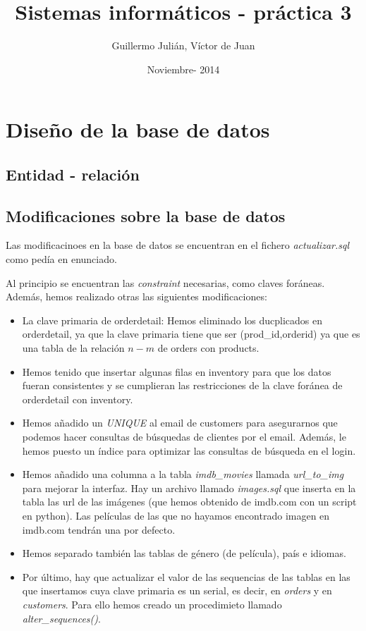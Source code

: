 \documentclass[nochap]{apuntes}
\title{Sistemas informáticos - práctica 3}
\author{Guillermo Julián, Víctor de Juan}
\date{Noviembre- 2014}
\begin{document}
\pagestyle{plain}
\maketitle

\tableofcontents
\newpage

\section{Diseño de la base de datos}
\subsection{Entidad - relación}

\subsection{Modificaciones sobre la base de datos}

Las modificacinoes en la base de datos se encuentran en el fichero \textit{actualizar.sql} como pedía en enunciado.


Al principio se encuentran las \textit{constraint} necesarias, como claves foráneas. Además, hemos realizado otras las siguientes modificaciones:

\begin{itemize}

\item La clave primaria de orderdetail: Hemos eliminado los ducplicados en orderdetail, ya que la clave primaria  tiene que ser (prod\_id,orderid) ya que es una tabla de la relación $n-m$ de orders con products. 

\item Hemos tenido que insertar algunas filas en inventory para que los datos fueran consistentes y se cumplieran las restricciones de la clave foránea de orderdetail con inventory.

\item Hemos añadido un \textit{UNIQUE} al email de customers para asegurarnos que podemos hacer consultas de búsquedas de clientes por el email. Además, le hemos puesto un índice para optimizar las consultas de búsqueda en el login.

\item Hemos añadido una columna a la tabla \textit{imdb\_movies} llamada \textit{url\_to\_img} para mejorar la interfaz. Hay un archivo llamado \textit{images.sql} que inserta en la tabla las url de las imágenes (que hemos obtenido de imdb.com con un script en python). Las películas de las que no hayamos encontrado imagen en imdb.com tendrán una por defecto.

\item Hemos separado también las tablas de género (de película), país e idiomas. 

\item Por último, hay que actualizar el valor de las sequencias de las tablas en las que insertamos cuya clave primaria es un serial, es decir, en \textit{orders} y en \textit{customers}. Para ello hemos creado un procedimieto llamado \textit{alter_sequences()}.
\end{itemize}
\end{document}
